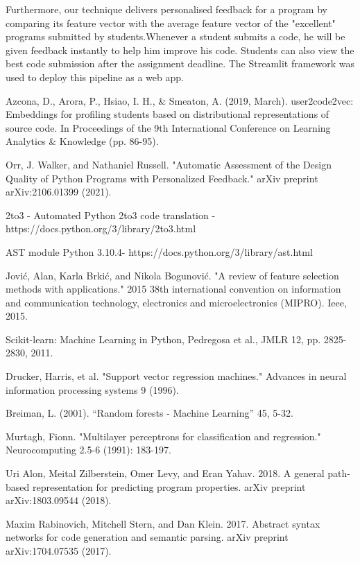 \documentclass[conference]{IEEEtran}
\begin{document}
Furthermore, our technique delivers personalised feedback for a program by comparing its feature vector with the average feature vector of the "excellent" programs submitted by students.Whenever a student submits a
code, he will be given feedback instantly to help him improve his
code.  Students can also view the best code submission after the
assignment deadline. The Streamlit framework was used to deploy this
pipeline as a web app.


\begin{thebibliography}{99}
  
  
 Azcona, D., Arora, P., Hsiao, I. H., \& Smeaton, A. (2019, March). user2code2vec: Embeddings for profiling students based on distributional representations of source code. In Proceedings of the 9th International Conference on Learning Analytics \& Knowledge (pp. 86-95).


Orr, J. Walker, and Nathaniel Russell. "Automatic Assessment of the Design Quality of Python Programs with Personalized Feedback." arXiv preprint arXiv:2106.01399 (2021).

 2to3 - Automated Python 2to3 code translation -https://docs.python.org/3/library/2to3.html


 AST module Python 3.10.4- https://docs.python.org/3/library/ast.html


 Jović, Alan, Karla Brkić, and Nikola Bogunović. "A review of feature selection methods with applications." 2015 38th international convention on information and communication technology, electronics and microelectronics (MIPRO). Ieee, 2015.

 Scikit-learn: Machine Learning in Python, Pedregosa et al., JMLR 12, pp. 2825-2830, 2011.


 Drucker, Harris, et al. "Support vector regression machines." Advances in neural information processing systems 9 (1996).

 Breiman, L. (2001). “Random forests - Machine Learning” 45, 5-32.

 Murtagh, Fionn. "Multilayer perceptrons for classification and regression." Neurocomputing 2.5-6 (1991): 183-197.


 Uri Alon, Meital Zilberstein, Omer Levy, and Eran Yahav. 2018. A general path-based representation for predicting program properties. arXiv preprint arXiv:1803.09544 (2018).

 Maxim Rabinovich, Mitchell Stern, and Dan Klein. 2017. Abstract syntax networks for code generation and semantic parsing. arXiv preprint arXiv:1704.07535 (2017).


\end{thebibliography}
\end{document}
